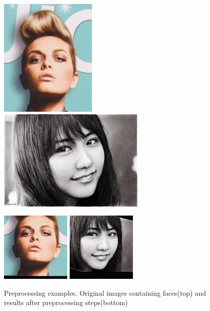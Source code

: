\begin{figure}[ht]
    \begin{center}
    \includegraphics[scale=0.6]{Graphics/000005.jpg}
    \includegraphics[scale=0.6]{Graphics/00000013_orig.jpeg}

    \includegraphics[scale=0.6]{Graphics/000004.png}
    \includegraphics[scale=0.6]{Graphics/00000013.jpeg}
    \end{center}
    \caption{Preprocessing examples. Original images containing faces(top) and results after preprocessing steps(bottom)}\label{FIG:preprocess}
\end{figure}

